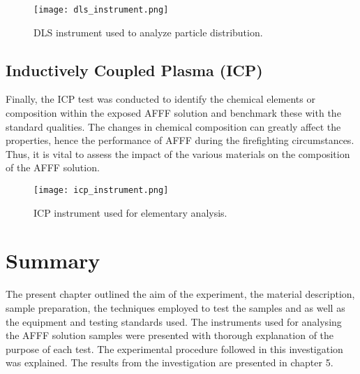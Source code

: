 \begin{figure}[H]
    \texttt{[image: dls\_instrument.png]}
    \caption{DLS instrument used to analyze particle distribution.}
    \label{ch4:figure:dls}
\end{figure}

\subsection{Inductively Coupled Plasma (ICP)}
Finally, the ICP test was conducted to identify the chemical elements or composition within the exposed AFFF solution and benchmark these with the standard qualities. The changes in chemical composition can greatly affect the properties, hence the performance of AFFF during the firefighting circumstances. Thus, it is vital to assess the impact of the various materials on the composition of the AFFF solution. 
 
\begin{figure}[H]
    \texttt{[image: icp\_instrument.png]}
    \caption{ICP instrument used for elementary analysis.}
    \label{ch4:figure:icp}
\end{figure}

\section{Summary}
The present chapter outlined the aim of the experiment, the material description, sample preparation, the techniques employed to test the samples and as well as the equipment and testing standards used. The instruments used for analysing the AFFF solution samples were presented with thorough explanation of the purpose of each test. The experimental procedure followed in this investigation was explained. The results from the investigation are presented in chapter 5.